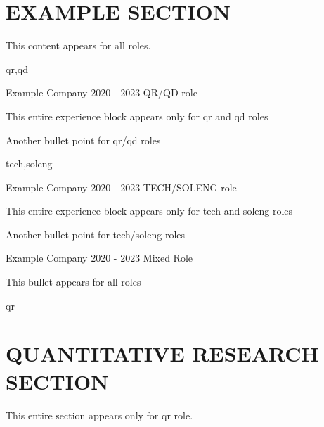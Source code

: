 
\section{EXAMPLE SECTION}

This content appears for all roles.

\begin{rolecontent}{qr,qd}
\begin{experience}
                   {Example Company}
                   {2020 - 2023}
                   {QR/QD role}
    \item This entire experience block appears only for qr and qd roles
    \item Another bullet point for qr/qd roles
\end{experience}
\end{rolecontent}

\begin{rolecontent}{tech,soleng}
\begin{experience}
                   {Example Company}
                   {2020 - 2023}
                   {TECH/SOLENG role}
    \item This entire experience block appears only for tech and soleng roles
    \item Another bullet point for tech/soleng roles
\end{experience}
\end{rolecontent}

\begin{experience}
                   {Example Company}
                   {2020 - 2023}
                   {Mixed Role}
    \item This bullet appears for all roles
\end{experience}

\begin{rolecontent}{qr}
\section{QUANTITATIVE RESEARCH SECTION}
This entire section appears only for qr role.
\end{rolecontent}

